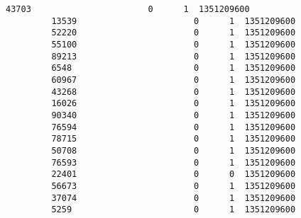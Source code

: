 \documentclass[11pt]{article}
\begin{document}
\begin{Verbatim}[commandchars=\\\{\}]
         43703                       0      1  1351209600   
         13539                       0      1  1351209600   
         52220                       0      1  1351209600   
         55100                       0      1  1351209600   
         89213                       0      1  1351209600   
         6548                        0      1  1351209600   
         60967                       0      1  1351209600   
         43268                       0      1  1351209600   
         16026                       0      1  1351209600   
         90340                       0      1  1351209600   
         76594                       0      1  1351209600   
         78715                       0      1  1351209600   
         50708                       0      1  1351209600   
         76593                       0      1  1351209600   
         22401                       0      0  1351209600   
         56673                       0      1  1351209600   
         37074                       0      1  1351209600   
         5259                        0      1  1351209600   
         

\end{Verbatim}
\end{document}
